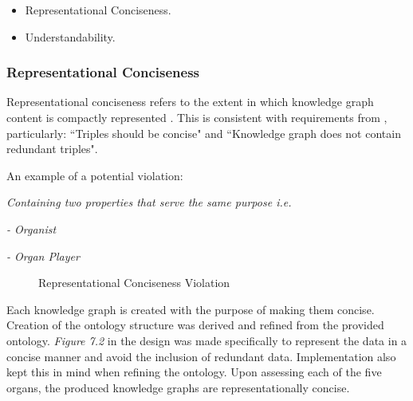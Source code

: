 \vspace{-0.15cm}
\begin{itemize}
    \itemsep0em 
\item Representational Conciseness.
\vspace{-0.1cm}
\item Understandability.
\end{itemize}
\vspace{-0.4cm}

\subsubsection{Representational Conciseness}
\hspace{0.5cm} Representational conciseness refers to the extent in which knowledge graph content is compactly represented \cite{knowledgegraphevaulationbook}. This is consistent with requirements from \cite{evaluationpaper}, particularly: ``Triples should be concise" and ``Knowledge graph does not contain redundant triples".

\noindent An example of a potential violation: 
\vspace{-0.1cm}
\begin{displayquote}
    \textit{Containing two properties that serve the same purpose i.e.}
\end{displayquote}
\vspace{-0.65cm}
\begin{displayquote}
    \textit{- Organist}
\end{displayquote}
\vspace{-0.825cm}
\begin{displayquote}
    \textit{- Organ Player}
\end{displayquote}

\begin{figure}[H]
\begin{center}
\end{center}
\vspace{-0.5cm}
\caption{Representational Conciseness Violation}
\end{figure}

Each knowledge graph is created with the purpose of making them concise. Creation of the ontology structure was derived and refined from the provided ontology. \textit{Figure 7.2} in the design was made specifically to represent the data in a concise manner and avoid the inclusion of redundant data. Implementation also kept this in mind when refining the ontology. Upon assessing each of the five organs, the produced knowledge graphs are representationally concise.

